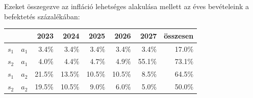 \documentclass[a4paper,12pt]{article}
\begin{document}
Ezeket összegezve az infláció lehetséges alakulása mellett az éves bevételeink a befektetés százalékában:
\begin{center}
\begin{tabular}{c c||r|r|r|r|r||r}
    &  & 2023& 2024  & 2025  & 2026 & 2027 & összesen \\
 \hline
 $s_1$&$a_1$&3.4$\%$&3.4$\%$&3.4$\%$&3.4$\%$&3.4$\%$ & 17.0$\%$ \\
 $s_2$&$a_1$&4.0$\%$&4.4$\%$&4.7$\%$&4.9$\%$&55.1$\%$ & 73.1$\%$ \\
 \hline
 $s_1$&$a_2$&21.5$\%$&13.5$\%$&10.5$\%$&10.5$\%$&8.5$\%$ & 64.5$\%$ \\
 $s_2$&$a_2$&19.5$\%$&10.5$\%$&9.0$\%$&6.0$\%$&5.0$\%$ & 50.0$\%$ \\

\end{tabular}
\end{center}


\end{document}
